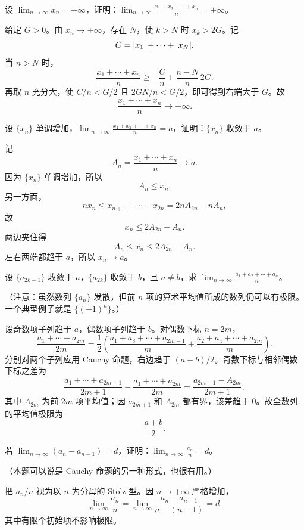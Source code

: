 \begin{xexercise}[1]
设 $\displaystyle\lim_{n\to\infty}x_n=+\infty$，证明：$\displaystyle\lim_{n\to\infty}\frac{x_1+x_2+\cdots+x_n}{n}=+\infty$。
\end{xexercise}
\begin{xsolution}
给定 $G>0$。由 $x_n\to+\infty$，存在 $N$，使 $k>N$ 时 $x_k>2G$。记
\[
  C=\lvert x_1\rvert+\cdots+\lvert x_N\rvert.
\]
当 $n>N$ 时，
\[
  \frac{x_1+\cdots+x_n}{n}
  \ge-\frac Cn+\frac{n-N}{n}\,2G.
\]
再取 $n$ 充分大，使 $C/n<G/2$ 且 $2GN/n<G/2$，即可得到右端大于 $G$。故
\[
  \frac{x_1+\cdots+x_n}{n}\to+\infty.
\]
\end{xsolution}


\begin{xexercise}[2]
设 $\{x_n\}$ 单调增加，$\displaystyle\lim_{n\to\infty}\frac{x_1+x_2+\cdots+x_n}{n}=a$，证明：$\{x_n\}$ 收敛于 $a$。
\end{xexercise}
\begin{xsolution}
记
\[
  A_n=\frac{x_1+\cdots+x_n}{n}\to a.
\]
因为 $\{x_n\}$ 单调增加，所以
\[
  A_n\le x_n.
\]
另一方面，
\[
  nx_n\le x_{n+1}+\cdots+x_{2n}=2nA_{2n}-nA_n,
\]
故
\[
  x_n\le2A_{2n}-A_n.
\]
两边夹住得
\[
  A_n\le x_n\le2A_{2n}-A_n.
\]
左右两端都趋于 $a$，所以 $x_n\to a$。
\end{xsolution}


\begin{xexercise}[3]
设 $\{a_{2k-1}\}$ 收敛于 $a$，$\{a_{2k}\}$ 收敛于 $b$，且 $a\ne b$，求 $\displaystyle\lim_{n\to\infty}\frac{a_1+a_2+\cdots+a_n}{n}$。

  （注意：虽然数列 $\{a_n\}$ 发散，但前 $n$ 项的算术平均值所成的数列仍可以有极限。一个典型例子就是 $\{(-1)^n\}$。）
\end{xexercise}
\begin{xsolution}
设奇数项子列趋于 $a$，偶数项子列趋于 $b$。对偶数下标 $n=2m$，
\[
  \frac{a_1+\cdots+a_{2m}}{2m}
  =\frac12\left(
    \frac{a_1+a_3+\cdots+a_{2m-1}}m
    +\frac{a_2+a_4+\cdots+a_{2m}}m
  \right).
\]
分别对两个子列应用 Cauchy 命题，右边趋于 $(a+b)/2$。奇数下标与相邻偶数下标之差为
\[
  \frac{a_1+\cdots+a_{2m+1}}{2m+1}
  -\frac{a_1+\cdots+a_{2m}}{2m}
  =\frac{a_{2m+1}-A_{2m}}{2m+1},
\]
其中 $A_{2m}$ 为前 $2m$ 项平均值；因 $a_{2m+1}$ 和 $A_{2m}$ 都有界，该差趋于 $0$。故全数列的平均值极限为
\[
  \boxed{\frac{a+b}{2}}.
\]
\end{xsolution}


\begin{xexercise}[4]
若 $\displaystyle\lim_{n\to\infty}(a_n-a_{n-1})=d$，证明：$\displaystyle\lim_{n\to\infty}\frac{a_n}{n}=d$。

  （本题可以说是 Cauchy 命题的另一种形式，也很有用。）
\end{xexercise}
\begin{xsolution}
把 $a_n/n$ 视为以 $n$ 为分母的 Stolz 型。因 $n\to+\infty$ 严格增加，
\[
  \lim_{n\to\infty}\frac{a_n}{n}
  =\lim_{n\to\infty}\frac{a_n-a_{n-1}}{n-(n-1)}=d.
\]
其中有限个初始项不影响极限。
\end{xsolution}


